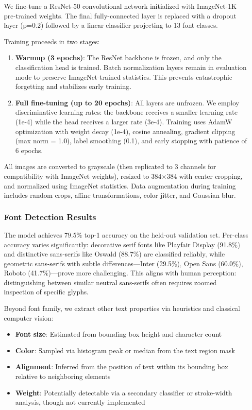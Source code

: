 \documentclass{article}
\begin{document}
We fine-tune a ResNet-50 \cite{He2016} convolutional network initialized with ImageNet-1K pre-trained weights. The final fully-connected layer is replaced with a dropout layer (p=0.2) followed by a linear classifier projecting to 13 font classes.

Training proceeds in two stages:
\begin{enumerate}
  \item \textbf{Warmup (3 epochs)}: The ResNet backbone is frozen, and only the classification
head is trained. Batch normalization layers remain in evaluation mode to preserve ImageNet-trained
statistics. This prevents catastrophic forgetting and stabilizes early training.

  \item \textbf{Full fine-tuning (up to 20 epochs)}: All layers are unfrozen. We employ
discriminative learning rates: the backbone receives a smaller learning rate (1e-4) while the head
receives a larger rate (3e-4). Training uses AdamW optimization with weight decay (1e-4), cosine
annealing, gradient clipping (max norm = 1.0), label smoothing (0.1), and early stopping with
patience of 6 epochs.
\end{enumerate}

All images are converted to grayscale (then replicated to 3 channels for compatibility with ImageNet
weights), resized to 384×384 with center cropping, and normalized using ImageNet statistics. Data
augmentation during training includes random crops, affine transformations, color jitter, and
Gaussian blur.

\subsubsection{Font Detection Results}

The model achieves 79.5\% top-1 accuracy on the held-out validation set. Per-class accuracy varies
significantly: decorative serif fonts like Playfair Display (91.8\%) and distinctive sans-serifs
like Oswald (88.7\%) are classified reliably, while geometric sans-serifs with subtle
differences---Inter (29.5\%), Open Sans (60.0\%), Roboto (41.7\%)---prove more challenging. This
aligns with human perception: distinguishing between similar neutral sans-serifs often requires
zoomed inspection of specific glyphs.

Beyond font family, we extract other text properties via heuristics and classical computer vision:
\begin{itemize}
  \item \textbf{Font size}: Estimated from bounding box height and character count
  \item \textbf{Color}: Sampled via histogram peak or median from the text region mask
  \item \textbf{Alignment}: Inferred from the position of text within its bounding box relative to
neighboring elements
  \item \textbf{Weight}: Potentially detectable via a secondary classifier or stroke-width
analysis, though not currently implemented
\end{itemize}
\end{document}
